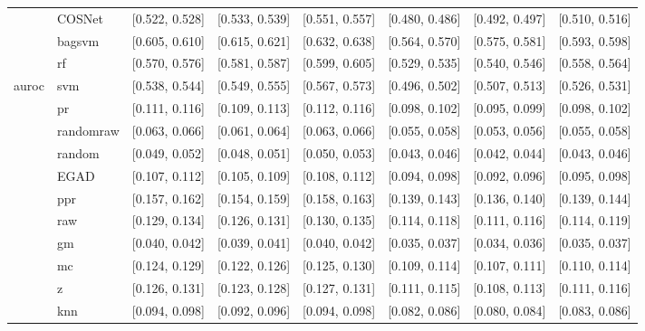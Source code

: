 \begin{table}[H]
{\begin{tabular}{llllllll}
 & COSNet & [0.522, 0.528] & [0.533, 0.539] & [0.551, 0.557] & [0.480, 0.486] & [0.492, 0.497] & [0.510, 0.516]\\

 & bagsvm & [0.605, 0.610] & [0.615, 0.621] & [0.632, 0.638] & [0.564, 0.570] & [0.575, 0.581] & [0.593, 0.598]\\

 & rf & [0.570, 0.576] & [0.581, 0.587] & [0.599, 0.605] & [0.529, 0.535] & [0.540, 0.546] & [0.558, 0.564]\\

\multirow{-15}{*}{\raggedright\arraybackslash auroc} & svm & [0.538, 0.544] & [0.549, 0.555] & [0.567, 0.573] & [0.496, 0.502] & [0.507, 0.513] & [0.526, 0.531]\\
\cmidrule{1-8}
 & pr & [0.111, 0.116] & [0.109, 0.113] & [0.112, 0.116] & [0.098, 0.102] & [0.095, 0.099] & [0.098, 0.102]\\

 & randomraw & [0.063, 0.066] & [0.061, 0.064] & [0.063, 0.066] & [0.055, 0.058] & [0.053, 0.056] & [0.055, 0.058]\\

 & random & [0.049, 0.052] & [0.048, 0.051] & [0.050, 0.053] & [0.043, 0.046] & [0.042, 0.044] & [0.043, 0.046]\\

 & EGAD & [0.107, 0.112] & [0.105, 0.109] & [0.108, 0.112] & [0.094, 0.098] & [0.092, 0.096] & [0.095, 0.098]\\

 & ppr & [0.157, 0.162] & [0.154, 0.159] & [0.158, 0.163] & [0.139, 0.143] & [0.136, 0.140] & [0.139, 0.144]\\

 & raw & [0.129, 0.134] & [0.126, 0.131] & [0.130, 0.135] & [0.114, 0.118] & [0.111, 0.116] & [0.114, 0.119]\\

 & gm & [0.040, 0.042] & [0.039, 0.041] & [0.040, 0.042] & [0.035, 0.037] & [0.034, 0.036] & [0.035, 0.037]\\

 & mc & [0.124, 0.129] & [0.122, 0.126] & [0.125, 0.130] & [0.109, 0.114] & [0.107, 0.111] & [0.110, 0.114]\\

 & z & [0.126, 0.131] & [0.123, 0.128] & [0.127, 0.131] & [0.111, 0.115] & [0.108, 0.113] & [0.111, 0.116]\\

 & knn & [0.094, 0.098] & [0.092, 0.096] & [0.094, 0.098] & [0.082, 0.086] & [0.080, 0.084] & [0.083, 0.086]\\


\end{tabular}}
\end{table}
